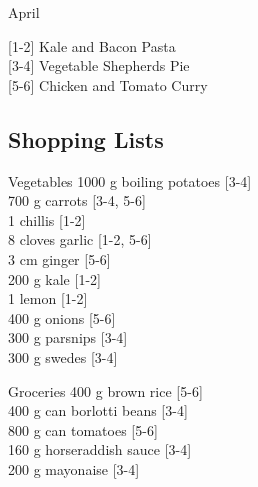 		\begin{menu}{April}
    
    \begin{recipelist}
    
        {\scriptsize[1-2]} Kale and Bacon Pasta\\
        {\scriptsize[3-4]} Vegetable Shepherds Pie\\
        {\scriptsize[5-6]} Chicken and Tomato Curry\\
    \end{recipelist}%
    \begin{recipelist}
    
    \end{recipelist}\par%
  
    \subsection*{Shopping Lists}
      \begin{shoppinglist}{Vegetables}
      1000 g boiling potatoes 
        {\scriptsize[3-4]}\\
      700 g carrots 
        {\scriptsize[3-4, 5-6]}\\
      1  chillis 
        {\scriptsize[1-2]}\\
      8 cloves garlic 
        {\scriptsize[1-2, 5-6]}\\
      3 cm ginger 
        {\scriptsize[5-6]}\\
      200 g kale 
        {\scriptsize[1-2]}\\
      1  lemon 
        {\scriptsize[1-2]}\\
      400 g onions 
        {\scriptsize[5-6]}\\
      300 g parsnips 
        {\scriptsize[3-4]}\\
      300 g swedes 
        {\scriptsize[3-4]}\\
      \end{shoppinglist}%
      \begin{shoppinglist}{Groceries}
      400 g brown rice 
        {\scriptsize[5-6]}\\
      400 g can borlotti beans 
        {\scriptsize[3-4]}\\
      800 g can tomatoes 
        {\scriptsize[5-6]}\\
      160 g horseraddish sauce 
        {\scriptsize[3-4]}\\
      200 g mayonaise 
        {\scriptsize[3-4]}\\

\end{shoppinglist}
\end{menu}
